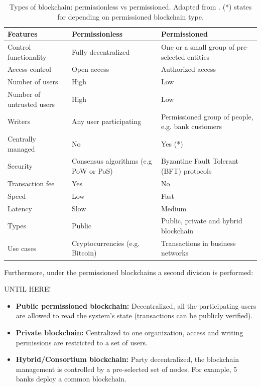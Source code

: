 \begin{table}[bth]
	\myfloatalign \footnotesize
	\begin{tabularx}{\textwidth}{>{\raggedright\arraybackslash}p{4cm} >{\raggedright\arraybackslash}p{6cm}>{\raggedright\arraybackslash}p{6cm}}
	\textbf{Features} & \textbf{Permissionless} & \textbf{Permissioned}\\ 
		\hline
		Control functionality & Fully decentralized & One or a small group of pre-selected entities \\
		Access control & Open access & Authorized access \\ 
		Number of users & High & Low \\
		Number of untrusted users & High & Low \\
		Writers & Any user participating & Permissioned group of people, e.g. bank customers \\
		Centrally managed & No & Yes (*) \\
		Security & Consensus algorithms (e.g PoW or PoS) & Byzantine Fault Tolerant (BFT) protocols \\
		Transaction fee & Yes & No \\
		Speed & Low & Fast \\
		Latency & Slow & Medium \\
		Types & Public & Public, private and hybrid blockchain \\
		Use cases & Cryptocurrencies (e.g. Bitcoin) & Transactions in business networks \\ \hline
	\end{tabularx}
		\caption{Types of blockchain: permissionless vs permissioned. Adapted from \citep{wust2017you}. (*) states for depending on permissioned blockchain type.}
	\label{tab:blockchainTypes}
\end{table}

Furthermore, under the permissioned blockchains a second division is performed:

UNTIL HERE!
\begin{itemize}
	\item \textbf{Public permissioned blockchain:} Decentralized, all the participating users are allowed to read the system's state (transactions can be publicly verified).
	\item \textbf{Private blockchain:} Centralized to one organization, access and writing permissions are restricted to a set of users.
	\item \textbf{Hybrid/Consortium blockchain:} Party decentralized, the blockchain management is controlled by a pre-selected set of nodes. For example, 5 banks deploy a common blockchain.
\end{itemize}

